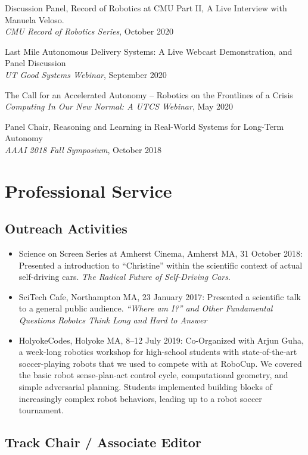 \documentclass[Times]{article}
\begin{document}
Discussion Panel, Record of Robotics at CMU Part II, A Live Interview with
Manuela Veloso.\\
{\em CMU Record of Robotics Series}, October 2020

Last Mile Autonomous Delivery Systems: A Live Webcast Demonstration, and Panel Discussion\\
{\em UT Good Systems Webinar}, September 2020

The Call for an Accelerated Autonomy -- Robotics on the Frontlines of a Crisis\\
{\em Computing In Our New Normal: A UTCS Webinar}, May 2020

Panel Chair, Reasoning and Learning in Real-World Systems for Long-Term
Autonomy\\
{\em AAAI 2018 Fall Symposium}, October 2018

\section*{Professional Service}

\subsection*{Outreach Activities}
\begin{itemize}
\item Science on Screen Series at Amherst Cinema, Amherst MA, 31 October 2018:
Presented a introduction to ``Christine'' within the scientific context of
actual self-driving cars. \emph{The Radical Future of Self-Driving Cars}.
\item SciTech Cafe, Northampton MA, 23 January 2017: Presented a scientific talk
to a general public audience. \emph{``Where am I?'' and
  Other Fundamental Questions Robotcs Think Long and Hard to Answer}
\item HolyokeCodes, Holyoke MA, 8--12 July 2019: Co-Organized with Arjun Guha, a week-long
robotics workshop for high-school students with state-of-the-art soccer-playing
robots that we used to compete with at RoboCup. We
covered the basic robot sense-plan-act control cycle, computational geometry,
and simple adversarial planning. Students implemented building blocks of
increasingly complex robot behaviors, leading up to a robot soccer tournament.
\end{itemize}

\subsection*{Track Chair / Associate Editor}
\end{document}
